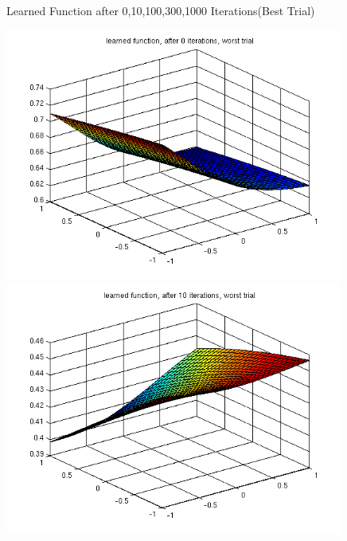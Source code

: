 \begin{figure}[hp!]
\begin{center}
\begin{minipage}{0.48\textwidth}
 \end{minipage}
 \caption{Learned Function after 0,10,100,300,1000 Iterations(Best Trial)}
\label{fig:learned_function_best}
\end{center}
\end{figure}


\begin{figure}[hp!]
\begin{center}
 \begin{minipage}{0.48\textwidth}
 \includegraphics[width=0.99\textwidth]{./figures/1/learned_worst_0}
 \end{minipage}
 \begin{minipage}{0.48\textwidth}
 \includegraphics[width=0.99\textwidth]{./figures/1/learned_worst_10}

\end{minipage}
\end{center}
\end{figure}
